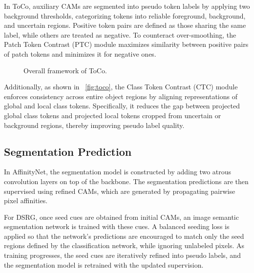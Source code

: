 In ToCo\cite{wsss_toco_token_contrast}, auxiliary CAMs are segmented into pseudo token labels by applying two background thresholds, categorizing tokens into reliable foreground, background, and uncertain regions. Positive token pairs are defined as those sharing the same label, while others are treated as negative. To counteract over-smoothing, the Patch Token Contrast (PTC) module maximizes similarity between positive pairs of patch tokens and minimizes it for negative ones. 
\begin{figure}[htbp]
    \centering
    \caption{Overall framework of ToCo.}
    \label{fig:toco}
\end{figure}
Additionally, as shown in ~\autoref{fig:toco}, the Class Token Contrast (CTC) module enforces consistency across entire object regions by aligning representations of global and local class tokens. Specifically, it reduces the gap between projected global class tokens and projected local tokens cropped from uncertain or background regions, thereby improving pseudo label quality.

\subsection{Segmentation Prediction}
\label{subsec:segmentation-prediction}
In AffinityNet\cite{wsss_affinitynet}, the segmentation model is constructed by adding two atrous convolution layers on top of the backbone. The segmentation predictions are then supervised using refined CAMs, which are generated by propagating pairwise pixel affinities.

For DSRG\cite{wsss_dsrg_deep_seeded_region_growing}, once seed cues are obtained from initial CAMs, an image semantic segmentation network is trained with these cues. A balanced seeding loss is applied so that the network's predictions are encouraged to match only the seed regions defined by the classification network, while ignoring unlabeled pixels. As training progresses, the seed cues are iteratively refined into pseudo labels, and the segmentation model is retrained with the updated supervision.

